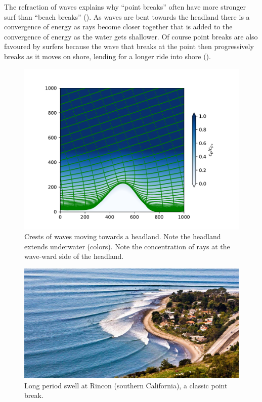 The refraction of waves explains why ``point breaks'' often have more stronger surf than ``beach breaks'' ().  As waves are bent towards the headland there is a convergence of energy as rays become closer together that is added to the convergence of energy as the water gets shallower. Of course point breaks are also favoured by surfers because the wave that breaks at the point then progressively breaks as it moves on shore, lending for a longer ride into shore ().

\begin{figure}[hbt]
  \begin{center}
    \includegraphics{figs/Waves/Raytraceheadland}
    \caption{Crests of waves moving towards a headland.  Note the headland extends underwater (colors).  Note the concentration of rays at the wave-ward side of the headland.}
    \label{fig:RaytraceHeadland}  
  \end{center}
\end{figure}

\begin{figure}[hbt]
  \begin{center}
    \includegraphics{figs/Waves/Rincon}
    \caption{Long period swell at Rincon (southern California), a classic point break.  }
    \label{fig:Rincon}  
  \end{center}
\end{figure}


